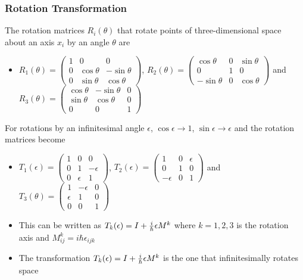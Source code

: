 \documentclass[8pt,t,mathserif,aspectratio=169]{beamer}
\begin{document}
\begin{frame}
  \frametitle{Rotation Transformation}
  \vspace{1mm}
  The rotation matrices $R_i(\theta)$ that rotate points of three-dimensional space about an axis $x_i$ by an angle $\theta$ are
  \begin{itemize}
    \item $R_1(\theta) = \begin{pmatrix} 1 & 0 & 0\\ 0 & \cos{\theta} & -\sin{\theta} \\ 0 & \sin{\theta} & \cos{\theta}\end{pmatrix}$, $R_2(\theta) = \begin{pmatrix} \cos{\theta} & 0 & \sin{\theta}\\ 0 & 1 & 0 \\ -\sin{\theta} & 0 & \cos{\theta}\end{pmatrix}$ and $R_3(\theta) = \begin{pmatrix} \cos{\theta} & -\sin{\theta} & 0\\ \sin{\theta} & \cos{\theta} &  0\\ 0 & 0 & 1\end{pmatrix}$
  \end{itemize}
  For rotations by an infinitesimal angle $\epsilon$, $\cos{\epsilon} \to 1$, $\sin{\epsilon} \to \epsilon$ and the rotation matrices become
  \begin{itemize}
    \item $T_1(\epsilon) = \begin{pmatrix} 1 & 0 & 0\\ 0 & 1 & -\epsilon \\ 0 & \epsilon & 1\end{pmatrix}$, $T_2(\epsilon) = \begin{pmatrix} 1 & 0 & \epsilon\\ 0 & 1 & 0 \\ -\epsilon & 0 & 1\end{pmatrix}$ and $T_3(\theta) = \begin{pmatrix} 1 & -\epsilon & 0\\ \epsilon & 1 &  0\\ 0 & 0 & 1\end{pmatrix}$
    \item This can be written as $T_{k}(\epsilon) = I + {i \over \hbar} \epsilon M^k$ where $k = 1,2,3$ is the rotation axis and $M^{k}_{ij} = i \hbar \epsilon_{ijk}$
    \item The transformation $T_k(\epsilon) = I + {i \over \hbar} \epsilon M^k$ is the one that infinitesimally rotates space

\end{itemize}
\end{frame}
\end{document}
